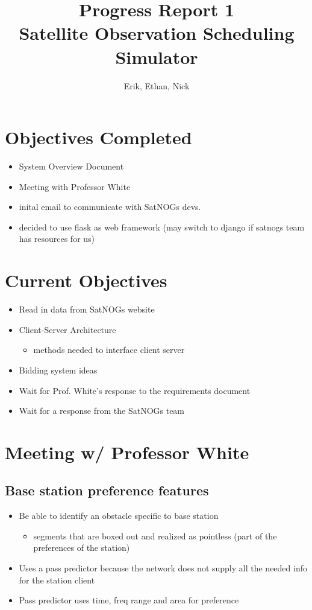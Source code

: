 \documentclass{article}
\title{Progress Report 1\\Satellite Observation Scheduling Simulator}
\author{Erik, Ethan, Nick}
\begin{document}
\maketitle

\section{Objectives Completed}

\begin{itemize}
	\item System Overview Document
	\item Meeting with Professor White
	\item inital email to communicate with SatNOGs devs.
	\item decided to use flask as web framework (may switch to django if satnogs team has resources for us)
\end{itemize}

\section{Current Objectives}

\begin{itemize}
  \item Read in data from SatNOGs website
  \item Client-Server Architecture
    \begin{itemize}
      \item methods needed to interface client server
    \end{itemize}
  \item Bidding system ideas
  \item Wait for Prof. White's response to the requirements document
  \item Wait for a response from the SatNOGs team
\end{itemize}

\section{Meeting w/ Professor White}

\subsection{Base station preference features}

\begin{itemize}
\item Be able to identify an obstacle specific to base station
  \begin{itemize}
    \item segments that are boxed out and realized as pointless (part of the preferences of the station)
  \end{itemize}
\item Uses a pass predictor because the network does not supply all the needed info for the station client
  \item Pass predictor uses time, freq range and area for preference
\end{itemize}
\end{document}
